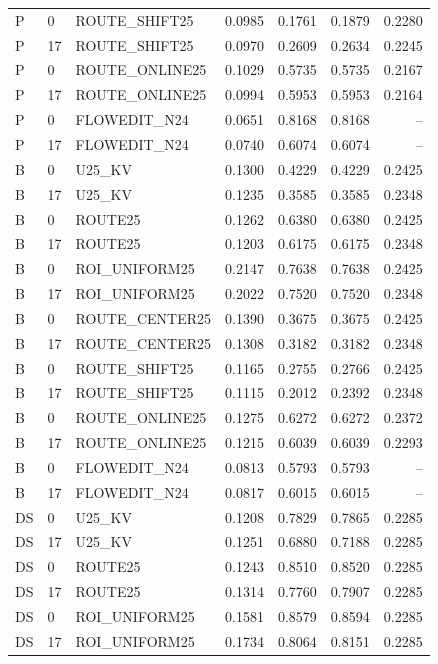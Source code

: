 \begin{longtable}{llp{.29\linewidth}rrrr}
P & 0 & ROUTE\_SHIFT25 & 0.0985 & 0.1761 & 0.1879 & 0.2280 \\
P & 17 & ROUTE\_SHIFT25 & 0.0970 & 0.2609 & 0.2634 & 0.2245 \\
P & 0 & ROUTE\_ONLINE25 & 0.1029 & 0.5735 & 0.5735 & 0.2167 \\
P & 17 & ROUTE\_ONLINE25 & 0.0994 & 0.5953 & 0.5953 & 0.2164 \\
P & 0 & FLOWEDIT\_N24 & 0.0651 & 0.8168 & 0.8168 & -- \\
P & 17 & FLOWEDIT\_N24 & 0.0740 & 0.6074 & 0.6074 & -- \\
B & 0 & U25\_KV & 0.1300 & 0.4229 & 0.4229 & 0.2425 \\
B & 17 & U25\_KV & 0.1235 & 0.3585 & 0.3585 & 0.2348 \\
B & 0 & ROUTE25 & 0.1262 & 0.6380 & 0.6380 & 0.2425 \\
B & 17 & ROUTE25 & 0.1203 & 0.6175 & 0.6175 & 0.2348 \\
B & 0 & ROI\_UNIFORM25 & 0.2147 & 0.7638 & 0.7638 & 0.2425 \\
B & 17 & ROI\_UNIFORM25 & 0.2022 & 0.7520 & 0.7520 & 0.2348 \\
B & 0 & ROUTE\_CENTER25 & 0.1390 & 0.3675 & 0.3675 & 0.2425 \\
B & 17 & ROUTE\_CENTER25 & 0.1308 & 0.3182 & 0.3182 & 0.2348 \\
B & 0 & ROUTE\_SHIFT25 & 0.1165 & 0.2755 & 0.2766 & 0.2425 \\
B & 17 & ROUTE\_SHIFT25 & 0.1115 & 0.2012 & 0.2392 & 0.2348 \\
B & 0 & ROUTE\_ONLINE25 & 0.1275 & 0.6272 & 0.6272 & 0.2372 \\
B & 17 & ROUTE\_ONLINE25 & 0.1215 & 0.6039 & 0.6039 & 0.2293 \\
B & 0 & FLOWEDIT\_N24 & 0.0813 & 0.5793 & 0.5793 & -- \\
B & 17 & FLOWEDIT\_N24 & 0.0817 & 0.6015 & 0.6015 & -- \\
DS & 0 & U25\_KV & 0.1208 & 0.7829 & 0.7865 & 0.2285 \\
DS & 17 & U25\_KV & 0.1251 & 0.6880 & 0.7188 & 0.2285 \\
DS & 0 & ROUTE25 & 0.1243 & 0.8510 & 0.8520 & 0.2285 \\
DS & 17 & ROUTE25 & 0.1314 & 0.7760 & 0.7907 & 0.2285 \\
DS & 0 & ROI\_UNIFORM25 & 0.1581 & 0.8579 & 0.8594 & 0.2285 \\
DS & 17 & ROI\_UNIFORM25 & 0.1734 & 0.8064 & 0.8151 & 0.2285 \\

\end{longtable}
